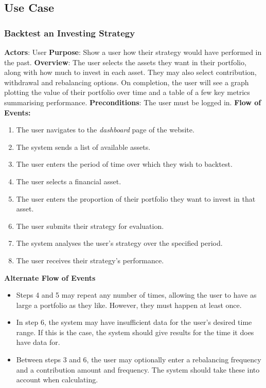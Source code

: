 \documentclass[main.tex]{subfiles}
\begin{document}
\subsection{Use Case}

\subsubsection{Backtest an Investing Strategy}

\textbf{Actors}: User
\newline
\newline
\textbf{Purpose}: Show a user how their strategy would have performed in the past.
\newline
\newline
\textbf{Overview}: The user selects the assets they want in their portfolio, along with how much to invest in each asset. They may also select contribution, withdrawal and rebalancing options. On completion, the user will see a graph plotting the value of their portfolio over time and a table of a few key metrics summarising performance.
\newline
\newline
\textbf{Preconditions}: The user must be logged in.
\newline
\newline
\textbf{Flow of Events:}
\newline
\begin{enumerate}
	\item The user navigates to the \textit{dashboard} page of the website.
	\item The system sends a list of available assets.
	\item The user enters the period of time over which they wish to backtest.
	\item The user selects a financial asset.
	\item The user enters the proportion of their portfolio they want to invest in that asset.
	\item The user submits their strategy for evaluation.
	\item The system analyses the user's strategy over the specified period.
	\item The user receives their strategy's performance.
\end{enumerate}
\textbf{Alternate Flow of Events}
\begin{itemize}
	\item Steps 4 and 5 may repeat any number of times, allowing the user to have as large a portfolio as they like. However, they must happen at least once.
	\item In step 6, the system may have insufficient data for the user's desired time range. If this is the case, the system should give results for the time it does have data for.
	\item Between steps 3 and 6, the user may optionally enter a rebalancing frequency and a contribution amount and frequency. The system should take these into account when calculating.
\end{itemize}
\end{document}
